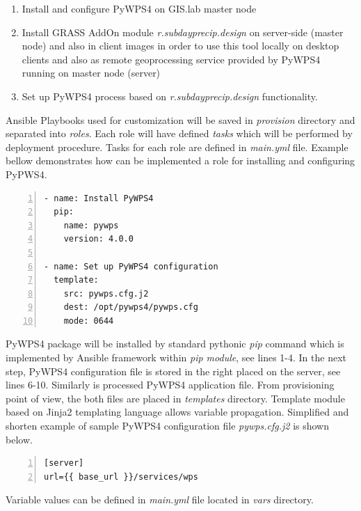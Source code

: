 \documentclass{isprs}
\begin{document}
\begin{enumerate}
\setlength\itemsep{0em}\setlength\parskip{0em}\setlength\topsep{0em}\setlength\partopsep{0em}\setlength\parsep{0em}
\item{Install and configure PyWPS4 on GIS.lab master node}
\item{Install GRASS AddOn module \textit{r.subdayprecip.design} on
    server-side (master node) and also in client images in order to
    use this tool locally on desktop clients and also as remote
    geoprocessing service provided by PyWPS4 running on master node
    (server)}
\item{Set up PyWPS4 process based on \textit{r.subdayprecip.design}
  functionality.}
\end{enumerate}

Ansible Playbooks used for customization will be saved in
\textit{provision} directory and separated into \textit{roles}. Each
role will have defined \textit{tasks} which will be performed by
deployment procedure. Tasks for each role are defined in
\textit{main.yml} file. Example bellow demonstrates how can be
implemented a role for installing and configuring PyPWS4.

\begin{lstlisting}[numbers=left,xleftmargin=1em]
- name: Install PyWPS4
  pip:
    name: pywps
    version: 4.0.0

- name: Set up PyWPS4 configuration
  template:
    src: pywps.cfg.j2
    dest: /opt/pywps4/pywps.cfg
    mode: 0644
\end{lstlisting}

PyWPS4 package will be installed by standard pythonic \textit{pip}
command which is implemented by Ansible framework within \textit{pip
  module}, see lines 1-4. In the next step, PyWPS4 configuration file
is stored in the right placed on the server, see lines
6-10. Simi\-larly is processed PyWPS4 application file. From
provisioning point of view, the both files are placed in
\textit{templates} directory. Template module based on Jinja2
templating language allows variable propagation. Simplified and
shorten example of sample PyWPS4 configuration file
\textit{pywps.cfg.j2} is shown below.

\begin{lstlisting}[numbers=left,xleftmargin=1em]
[server]
url={{ base_url }}/services/wps
\end{lstlisting}

Variable values can be defined in \textit{main.yml} file located in
\textit{vars} directory.
\end{document}
